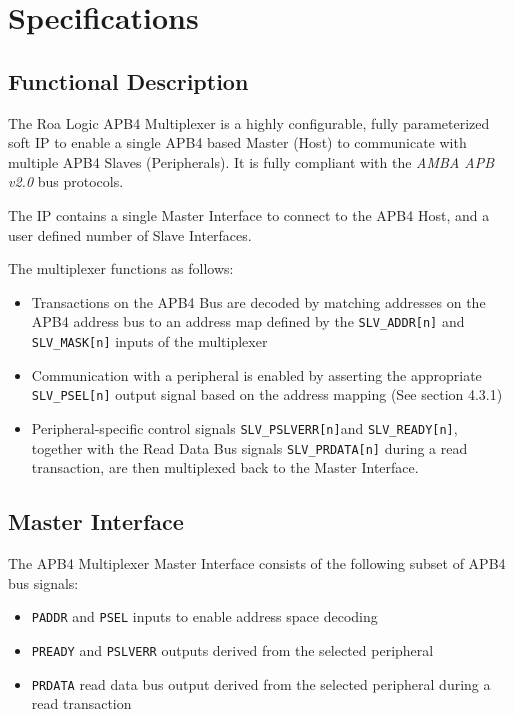 \chapter{Specifications} \label{specifications}

\section{Functional Description} \label{functional-description}

The Roa Logic APB4 Multiplexer is a highly configurable, fully parameterized
soft IP to enable a single APB4 based Master (Host) to communicate with
multiple APB4 Slaves (Peripherals). It is fully compliant with the
\emph{AMBA APB v2.0} bus protocols.

The IP contains a single Master Interface to connect to the APB4 Host,
and a user defined number of Slave Interfaces.

The multiplexer functions as follows:

\begin{itemize}
\item
  Transactions on the APB4 Bus are decoded by matching addresses on the
  APB4 address bus to an address map defined by the \texttt{SLV\_ADDR[n]} and
  \texttt{SLV\_MASK[n]} inputs of the multiplexer 
\item
  Communication with a peripheral is enabled by asserting the
  appropriate \texttt{SLV\_PSEL[n]} output signal based on the address
  mapping (See section 4.3.1)
\item
  Peripheral-specific control signals \texttt{SLV\_PSLVERR[n]}and
  \texttt{SLV\_READY[n]}, together with the Read Data Bus signals
  \texttt{SLV\_PRDATA[n]} during a read transaction, are then multiplexed
  back to the Master Interface.
\end{itemize}

\section{Master Interface} \label{master-interface}

The APB4 Multiplexer Master Interface consists of the following subset
of APB4 bus signals:

\begin{itemize}
\item
  \texttt{PADDR} and \texttt{PSEL} inputs to enable address space decoding
\item
  \texttt{PREADY} and \texttt{PSLVERR} outputs derived from the selected peripheral
\item
  \texttt{PRDATA} read data bus output derived from the selected peripheral
  during a read transaction
\end{itemize}

